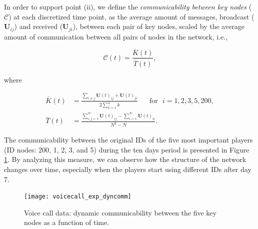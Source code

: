 In order to support point (ii), we define the \textit{communicability between key nodes} ($\mathcal{C}$) at each discretized time point, as the average amount of messages, broadcast ($\mathbf{U}_{ij}$) and received ($\mathbf{U}_{ji}$), between each pair of key nodes, scaled by the average amount of communication between all pairs of nodes in the network, i.e.,

\begin{equation*}
    \mathcal{C}(t) = \frac{\overline{K}(t)}{\overline{T}(t)},
\end{equation*}

where

\begin{align*}
    \overline{K}(t) &=\frac{\sum_{i\ne j}\mathbf{U}(t)_{ij} + \mathbf{U}(t)_{ji}}{2\sum_{k=1}^4 k} \text{~~~~~for~~} i=1,2,3,5,200 ,\\
    \overline{T}(t) &=\frac{\sum_{i,j=1}^N \mathbf{U}(t)_{ij} - \sum_{i=1}^N \mathbf{U}(t)_{ii}}{N^2-N}.
\end{align*}

The communicability between the original IDs of the five most important players (ID nodes: 200, 1, 2, 3, and 5) during the ten days period is presented in Figure \ref{fig:ve2}. By analyzing this measure, we can observe how the structure of the network changes over time, especially when the players start using different IDs after day 7.

\begin{figure}[h]\centering
    \texttt{[image: voicecall\_exp\_dyncomm]}
    \caption{Voice call data: dynamic communicability between the five key nodes as a function of time.}
    \label{fig:ve2}
    \bigskip
\end{figure}